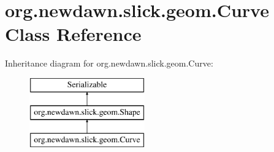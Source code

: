 \hypertarget{classorg_1_1newdawn_1_1slick_1_1geom_1_1_curve}{}\section{org.\+newdawn.\+slick.\+geom.\+Curve Class Reference}
\label{classorg_1_1newdawn_1_1slick_1_1geom_1_1_curve}
Inheritance diagram for org.\+newdawn.\+slick.\+geom.\+Curve\+:\begin{figure}[H]
\begin{center}
\leavevmode
\includegraphics[height=3.000000cm]{classorg_1_1newdawn_1_1slick_1_1geom_1_1_curve}
\end{center}
\end{figure}
